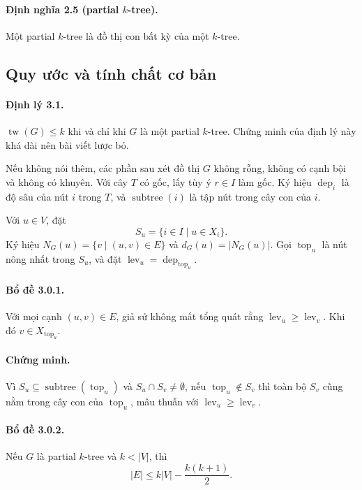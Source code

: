 \documentclass[11pt]{article}
\begin{document}
\paragraph{Định nghĩa 2.5 (partial $k$-tree).}
Một partial $k$-tree là đồ thị con bất kỳ của một $k$-tree.

\subsection{Quy ước và tính chất cơ bản}

\paragraph{Định lý 3.1.}
$\operatorname{tw}(G)\le k$ khi và chỉ khi $G$ là một partial $k$-tree. Chứng
minh của định lý này khá dài nên bài viết lược bỏ.

Nếu không nói thêm, các phần sau xét đồ thị $G$ không rỗng, không có cạnh bội
và không có khuyên. Với cây $T$ có gốc, lấy tùy ý $r\in I$ làm gốc. Ký hiệu
$\operatorname{dep}_i$ là độ sâu của nút $i$ trong $T$, và
$\operatorname{subtree}(i)$ là tập nút trong cây con của $i$.

Với $u\in V$, đặt
\[
  S_u=\{i\in I\mid u\in X_i\}.
\]
Ký hiệu $N_G(u)=\{v\mid (u,v)\in E\}$ và $d_G(u)=|N_G(u)|$. Gọi
$\operatorname{top}_u$ là nút nông nhất trong $S_u$, và đặt
$\operatorname{lev}_u=\operatorname{dep}_{\operatorname{top}_u}$.

\paragraph{Bổ đề 3.0.1.}
Với mọi cạnh $(u,v)\in E$, giả sử không mất tổng quát rằng
$\operatorname{lev}_u\ge \operatorname{lev}_v$. Khi đó
$v\in X_{\operatorname{top}_u}$.

\paragraph{Chứng minh.}
Vì $S_u\subseteq \operatorname{subtree}(\operatorname{top}_u)$ và
$S_u\cap S_v\ne\emptyset$, nếu $\operatorname{top}_u\notin S_v$ thì toàn bộ
$S_v$ cũng nằm trong cây con của $\operatorname{top}_u$, mâu thuẫn với
$\operatorname{lev}_u\ge \operatorname{lev}_v$.

\paragraph{Bổ đề 3.0.2.}
Nếu $G$ là partial $k$-tree và $k<|V|$, thì
\[
  |E|\le k|V|-\frac{k(k+1)}2.
\]
\end{document}
